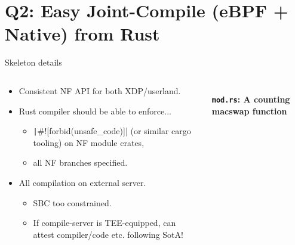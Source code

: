 \documentclass[aspectratio=169,xcolor={dvipsnames}
]{beamer}
\begin{document}
\section{Q2: Easy Joint-Compile (eBPF + Native) from Rust }

\begin{frame}[fragile=singleslide]{Skeleton details}
	\begin{columns}
		\begin{column}{0.5\linewidth}
			\begin{itemize}
				\item Consistent NF API for both XDP/userland.
				\item Rust compiler should be able to enforce...
				\begin{itemize}
					\item \texttt|#![forbid(unsafe_code)]| (or similar cargo tooling) on NF module crates,
					\item all NF branches specified.
				\end{itemize}
				\item All compilation on external server.
				\begin{itemize}
					\item SBC too constrained.
					\item If compile-server is TEE-equipped, \alert{can attest compiler/code} etc. following SotA!
				\end{itemize}
			\end{itemize}
		\end{column}
		\begin{column}{0.5\linewidth}
			\centering
%				
%	
\inputminted[fontsize={\fontsize{5.5}{6.5}\selectfont}]{rust}{listings/macswap.rs}
			\textbf{\texttt{mod.rs}: A counting macswap function}
		\end{column}
	\end{columns}
\end{frame}
\end{document}
